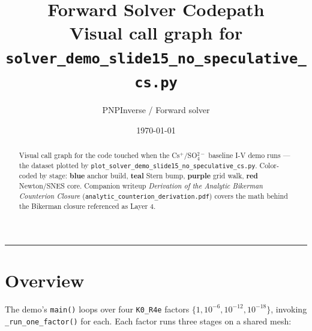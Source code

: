 \documentclass[11pt]{article}
\title{\bfseries Forward Solver Codepath\\
\large{\normalfont Visual call graph for}
\texttt{\bfseries solver\_demo\_slide15\_no\_speculative\_cs.py}}
\author{\normalsize PNPInverse / Forward solver}
\date{\today}
\begin{document}
\maketitle

\begin{abstract}\noindent
Visual call graph for the code touched when the Cs$^+$/SO$_4^{2-}$
baseline I-V demo runs --- the dataset plotted by
\texttt{plot\_solver\_demo\_slide15\_no\_speculative\_cs.py}.
Color-coded by stage:
\textcolor{stageOne}{\textbf{blue}} anchor build,
\textcolor{stageTwo}{\textbf{teal}} Stern bump,
\textcolor{stageThree}{\textbf{purple}} grid walk,
\textcolor{newtonCore}{\textbf{red}} Newton/SNES core.  Companion writeup
\emph{Derivation of the Analytic Bikerman Counterion Closure}
(\texttt{analytic\_counterion\_derivation.pdf}) covers the math behind
the Bikerman closure referenced as Layer 4.
\end{abstract}

\vspace{-0.4em}\hrule\vspace{0.4em}

\section{Overview}

The demo's \texttt{main()} loops over four \texttt{K0\_R4e} factors
$\{1, 10^{-6}, 10^{-12}, 10^{-18}\}$, invoking
\texttt{\_run\_one\_factor()} for each.  Each factor runs three stages
on a shared mesh:
\end{document}
